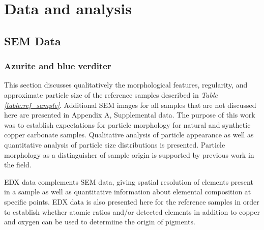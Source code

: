 \chapter{Data and analysis}

\ifpdf
    \graphicspath{{Chapter3/Figs/Raster/}{Chapter3/Figs/PDF/}{Chapter3/Figs/}}
\else
    \graphicspath{{Chapter3/Figs/Vector/}{Chapter3/Figs/}}
\fi

\section[SEM Data]{SEM Data}
\label{section3.1}

\subsection[Azurite and blue verditer]{Azurite and blue verditer}
\label{subsection3.1.1}

This section discusses qualitatively the morphological features, regularity, and approximate particle size of the reference samples described in \textit{Table \ref{table:ref_sample}}. Additional SEM images for all samples that are not discussed here are presented in Appendix A, Supplemental data. The purpose of this work was to establish expectations for particle morphology for natural and synthetic copper carbonate samples. Qualitative analysis of particle appearance as well as quantitative analysis of particle size distributions is presented. Particle morphology as a distinguisher of sample origin is supported by previous work in the field.~\autocite{MacTaggart,Naumova1994,Naumova1990,Keith2003}

EDX data complements SEM data, giving spatial resolution of elements present in a sample as well as quantitative information about elemental composition at specific points. EDX data is also presented here for the reference samples in order to establish whether atomic ratios and/or detected elements in addition to copper and oxygen can be used to determiine the origin of pigments.




